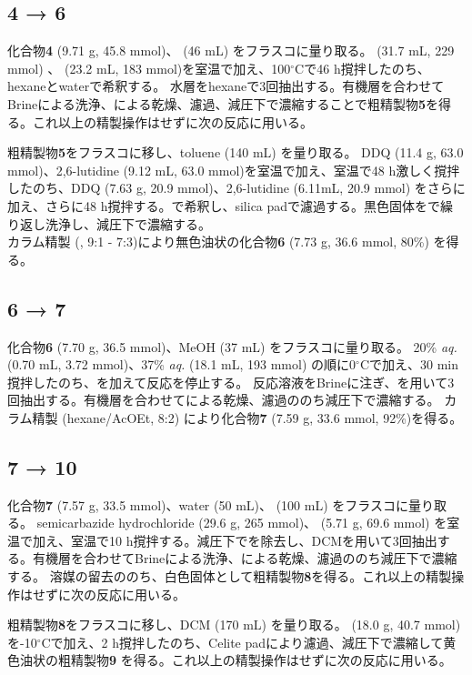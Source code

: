 \documentclass{ltjsarticle}
\theoremstyle{definition}
\numberwithin{equation}{section}
\newcommand{\D}{^\circ\text{C}}
\begin{document}
\subsection{\textbf{4} → \textbf{6}}
化合物\textbf{4} (9.71  g, 45.8 mmol)、 (46 mL) をフラスコに量り取る。
 (31.7 mL, 229 mmol) 、 (23.2 mL, 183 mmol)を室温で加え、100$\D$で46 h撹拌したのち、hexaneとwaterで希釈する。
水層をhexaneで3回抽出する。有機層を合わせてBrineによる洗浄、による乾燥、濾過、減圧下で濃縮することで粗精製物\textbf{5}を得る。これ以上の精製操作はせずに次の反応に用いる。

粗精製物\textbf{5}をフラスコに移し、toluene (140 mL) を量り取る。
DDQ (11.4 g,  63.0 mmol)、2,6-lutidine (9.12 mL, 63.0 mmol)を室温で加え、室温で48 h激しく撹拌したのち、DDQ (7.63 g, 20.9 mmol)、2,6-lutidine (6.11mL, 20.9 mmol) をさらに加え、さらに48 h撹拌する。で希釈し、silica padで濾過する。黒色固体をで繰り返し洗浄し、減圧下で濃縮する。\\
カラム精製 (, 9:1 - 7:3)により無色油状の化合物\textbf{6} (7.73 g, 36.6 mmol, 80\%) を得る。


\subsection{\textbf{6} → \textbf{7}}
化合物\textbf{6} (7.70  g, 36.5 mmol)、MeOH (37 mL) をフラスコに量り取る。
20\% \textit{aq.} (0.70 mL, 3.72 mmol)、37\% \textit{aq.} (18.1 mL, 193 mmol) の順に0$\D$で加え、30 min撹拌したのち、を加えて反応を停止する。
反応溶液をBrineに注ぎ、を用いて3回抽出する。有機層を合わせてによる乾燥、濾過ののち減圧下で濃縮する。
カラム精製 (hexane/AcOEt, 8:2) により化合物\textbf{7} (7.59 g, 33.6 mmol, 92\%)を得る。


\subsection{\textbf{7} → \textbf{10}}
化合物\textbf{7} (7.57 g, 33.5 mmol)、water (50 mL)、 (100 mL) をフラスコに量り取る。
semicarbazide hydrochloride (29.6 g, 265 mmol)、 (5.71 g, 69.6 mmol) を室温で加え、室温で10 h撹拌する。減圧下でを除去し、DCMを用いて3回抽出する。有機層を合わせてBrineによる洗浄、による乾燥、濾過ののち減圧下で濃縮する。
溶媒の留去ののち、白色固体として粗精製物\textbf{8}を得る。これ以上の精製操作はせずに次の反応に用いる。

粗精製物\textbf{8}をフラスコに移し、DCM (170 mL) を量り取る。
 (18.0 g, 40.7 mmol) を-10$\D$で加え、2 h撹拌したのち、Celite padにより濾過、減圧下で濃縮して黄色油状の粗精製物\textbf{9} を得る。これ以上の精製操作はせずに次の反応に用いる。
\end{document}
